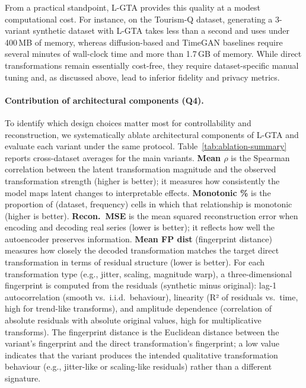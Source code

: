 From a practical standpoint, L-GTA provides this quality at a modest computational cost. For instance, on the Tourism-Q dataset, generating a 3-variant synthetic dataset with L-GTA takes less than a second and uses under 400\,MB of memory, whereas diffusion-based and TimeGAN baselines require several minutes of wall-clock time and more than 1.7\,GB of memory. While direct transformations remain essentially cost-free, they require dataset-specific manual tuning and, as discussed above, lead to inferior fidelity and privacy metrics.

\paragraph{Contribution of architectural components (Q4).}
To identify which design choices matter most for controllability and reconstruction, we systematically ablate architectural components of L-GTA and evaluate each variant under the same protocol. Table~\ref{tab:ablation-summary} reports cross-dataset averages for the main variants. \textbf{Mean $\rho$} is the Spearman correlation between the latent transformation magnitude and the observed transformation strength (higher is better); it measures how consistently the model maps latent changes to interpretable effects. \textbf{Monotonic \%} is the proportion of (dataset, frequency) cells in which that relationship is monotonic (higher is better). \textbf{Recon.\ MSE} is the mean squared reconstruction error when encoding and decoding real series (lower is better); it reflects how well the autoencoder preserves information. \textbf{Mean FP dist} (fingerprint distance) measures how closely the decoded transformation matches the target direct transformation in terms of residual structure (lower is better). For each transformation type (e.g., jitter, scaling, magnitude warp), a three-dimensional fingerprint is computed from the residuals (synthetic minus original): lag-1 autocorrelation (smooth vs.\ i.i.d.\ behaviour), linearity (R² of residuals vs.\ time, high for trend-like transforms), and amplitude dependence (correlation of absolute residuals with absolute original values, high for multiplicative transforms). The fingerprint distance is the Euclidean distance between the variant's fingerprint and the direct transformation's fingerprint; a low value indicates that the variant produces the intended qualitative transformation behaviour (e.g., jitter-like or scaling-like residuals) rather than a different signature.

